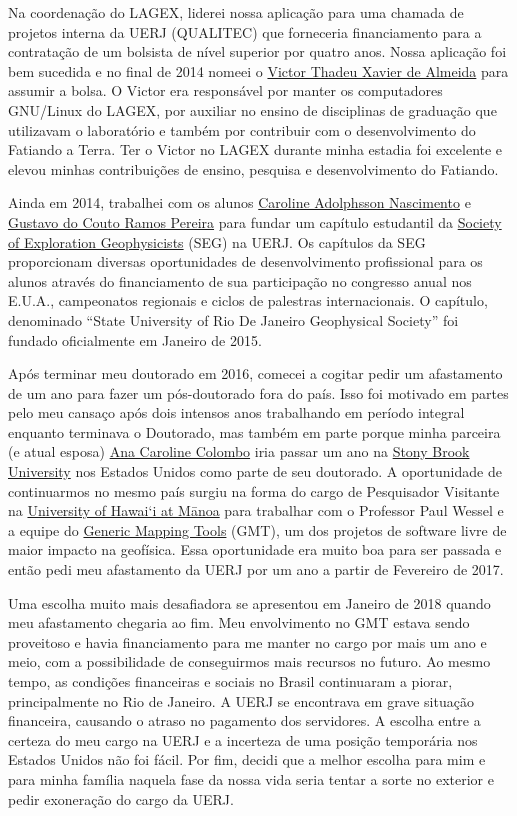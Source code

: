 \documentclass[12pt,a4paper,oneside]{book}
\newcommand{\UHM}{University of Hawai`i at M\={a}noa}
\newcommand{\GMTLink}{\href{https://www.generic-mapping-tools.org}{Generic Mapping Tools}}
\begin{document}
Na coordenação do LAGEX, liderei nossa aplicação para uma chamada de projetos
interna da UERJ (QUALITEC) que forneceria financiamento para a
contratação de um bolsista de nível superior por quatro anos.
Nossa aplicação foi bem sucedida e no final de 2014 nomeei o
\href{https://www.linkedin.com/in/victorxalmeida/}{Victor Thadeu Xavier de Almeida}
para assumir a bolsa.
O Victor era responsável por manter os computadores GNU/Linux do LAGEX,
por auxiliar no ensino de disciplinas de graduação que utilizavam o
laboratório e também por contribuir com o desenvolvimento do Fatiando a Terra.
Ter o Victor no LAGEX durante minha estadia foi excelente e elevou minhas
contribuições de ensino, pesquisa e desenvolvimento do Fatiando.

Ainda em 2014, trabalhei com os alunos
\href{https://www.linkedin.com/in/caroline-adolphsson-61723137/}{Caroline Adolphsson Nascimento}
e \href{https://www.linkedin.com/in/gustavo-pereira-780839111/}{Gustavo do Couto Ramos Pereira}
para fundar um capítulo estudantil da
\href{https://seg.org}{Society of Exploration Geophysicists} (SEG) na UERJ.
Os capítulos da SEG proporcionam diversas oportunidades de desenvolvimento
profissional para os alunos através do financiamento de sua participação no
congresso anual nos E.U.A., campeonatos regionais e ciclos de palestras
internacionais.
O capítulo, denominado ``State University of Rio De Janeiro Geophysical
Society'' foi fundado oficialmente em Janeiro de 2015.

Após terminar meu doutorado em 2016, comecei a cogitar pedir um afastamento de
um ano para fazer um pós-doutorado fora do país.
Isso foi motivado em partes pelo meu cansaço após dois intensos anos
trabalhando em período integral enquanto terminava o Doutorado, mas também em
parte porque minha parceira (e atual esposa)
\href{https://www.acarolcolombo.com/}{Ana Caroline Colombo} iria passar um ano
na \href{https://www.stonybrook.edu/}{Stony Brook University} nos Estados
Unidos como parte de seu doutorado.
A oportunidade de continuarmos no mesmo país surgiu na forma do cargo de
Pesquisador Visitante na
\href{https://www.hawaii.edu/}{\UHM{}} para trabalhar com o Professor Paul
Wessel e a equipe do \GMTLink{} (GMT),
um dos projetos de software livre de maior impacto na geofísica.
Essa oportunidade era muito boa para ser passada e então pedi meu afastamento
da UERJ por um ano a partir de Fevereiro de 2017.

Uma escolha muito mais desafiadora se apresentou em Janeiro de 2018 quando meu
afastamento chegaria ao fim.
Meu envolvimento no GMT estava sendo proveitoso e havia financiamento para me
manter no cargo por mais um ano e meio, com a possibilidade de conseguirmos
mais recursos no futuro.
Ao mesmo tempo, as condições financeiras e sociais no Brasil continuaram a
piorar, principalmente no Rio de Janeiro.
A UERJ se encontrava em grave situação financeira, causando o atraso no
pagamento dos servidores.
A escolha entre a certeza do meu cargo na UERJ e a incerteza de uma posição
temporária nos Estados Unidos não foi fácil.
Por fim, decidi que a melhor escolha para mim e para minha família naquela fase
da nossa vida seria tentar a sorte no exterior e pedir exoneração do cargo da
UERJ.
\end{document}
